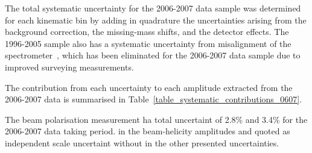 The total systematic uncertainty for the 2006-2007 data sample was
determined for each kinematic bin by adding in quadrature the
  uncertainties arising from the background correction, the
  missing-mass shifts, and the detector effects.  The 1996-2005 sample also has a
systematic uncertainty from misalignment of the spectrometer~\cite{Air09}, which has been eliminated for the 2006-2007 data sample due to improved
  surveying measurements. 

The contribution from each uncertainty to each amplitude extracted from the 2006-2007 data  is summarised in Table~\ref{table_systematic_contributions_0607}.

The beam polarisation measurement ha total uncertaint of 2.8\%  and 3.4\% for the 2006-2007 data taking period.  in the beam-helicity amplitudes and  quoted as independent scale uncertaint without  in the other presented uncertainties.


